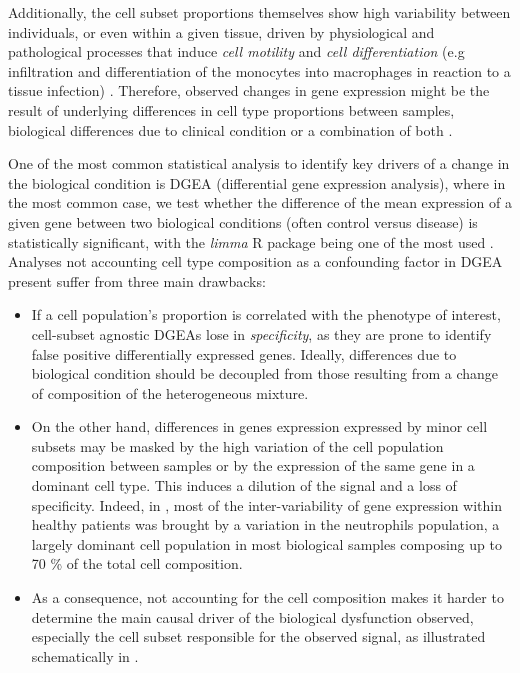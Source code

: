 Additionally, the cell subset proportions themselves show high
variability between individuals, or even within a given tissue, driven
by physiological and pathological processes that induce \emph{cell
motility} and \emph{cell differentiation} (e.g infiltration and
differentiation of the monocytes into macrophages in reaction to a
tissue infection) \autocite{shen-orr_gaujoux13}. Therefore, observed changes in gene expression might
be the result of underlying differences in cell type proportions between
samples, biological differences due to clinical condition or a
combination of both \autocite{kuhn_etal12}.

One of the most common statistical analysis to identify key drivers of a
change in the biological condition is DGEA (differential gene expression
analysis), where in the most common case, we test whether the difference
of the mean expression of a given gene between two biological conditions
(often control versus disease) is statistically significant, with the
\emph{limma} R package being one of the most used
\autocite{smyth_etal22}. Analyses not accounting cell type composition as a confounding factor in
DGEA present suffer from three main drawbacks:

\begin{itemize}

\item
  If a cell population's proportion is correlated with the phenotype of
  interest, cell-subset agnostic DGEAs lose in \emph{specificity}, as
  they are prone to identify false positive differentially expressed
  genes. Ideally, differences due to biological condition should be
  decoupled from those resulting from a change of composition of the
  heterogeneous mixture.
  
\item On the other hand, differences in genes expression expressed by minor cell subsets may be masked by the high variation of the cell population
composition between samples or by the expression of the same gene in a
dominant cell type. This induces a dilution of the signal and a loss of
specificity. Indeed, in \autocite{whitney_etal03}, most of the inter-variability of gene expression within healthy patients was brought by a variation in the neutrophils
population, a largely dominant cell population in most biological
samples composing up to 70 \% of the total cell composition. 

\item As a consequence, not accounting for the cell composition makes it harder to determine the main causal driver of the biological dysfunction observed, especially the cell subset responsible for the observed signal, as illustrated schematically in .
\end{itemize}

